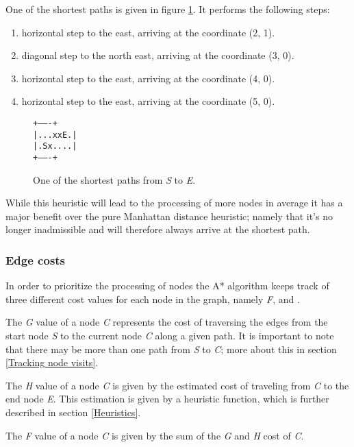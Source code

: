 \documentclass[12pt, a4paper]{article}
\begin{document}
One of the shortest paths is given in figure \ref{fig:grid2}. It performs the
following steps:
\begin{enumerate}
	\item horizontal step to the east, arriving at the coordinate (2, 1).
	\item diagonal step to the north east, arriving at the coordinate (3, 0).
	\item horizontal step to the east, arriving at the coordinate (4, 0).
	\item horizontal step to the east, arriving at the coordinate (5, 0).
\end{enumerate}

\begin{figure}[htbp]
	\centering
	\texttt{+-------+ \\
|...xxE.| \\
|.Sx....| \\
+-------+}
	\caption{\label{fig:grid2} One of the shortest paths from \textit{S} to
	\textit{E}.}
\end{figure}

While this heuristic will lead to the processing of more nodes in average it has
a major benefit over the pure Manhattan distance heuristic; namely that it's no
longer inadmissible and will therefore always arrive at the shortest path.


\subsubsection{Edge costs}
\label{Edge costs}

In order to prioritize the processing of nodes the A* algorithm keeps track of
three different cost values for each node in the graph, namely \textit{F},
 and .

The \textit{G} value of a node \textit{C} represents the cost of traversing the
edges from the start node \textit{S} to the current node \textit{C} along a
given path. It is important to note that there may be more than one path from
\textit{S} to \textit{C}; more about this in section \ref{Tracking node visits}.

The \textit{H} value of a node \textit{C} is given by the estimated cost of
traveling from \textit{C} to the end node \textit{E}. This estimation is given
by a heuristic function, which is further described in section \ref{Heuristics}.

The \textit{F} value of a node \textit{C} is given by the sum of the \textit{G}
and \textit{H} cost of \textit{C}.
\end{document}
